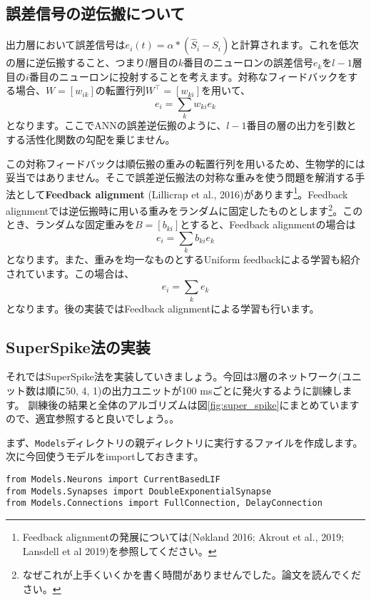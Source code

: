 \subsection{誤差信号の逆伝搬について}
出力層において誤差信号は$e_i(t)=\alpha * \left(\hat{S}_{i}-S_{i}\right)$と計算されます。これを低次の層に逆伝搬すること、つまり$l$層目の$k$番目のニューロンの誤差信号$e_k$を$l-1$層目の$i$番目のニューロンに投射することを考えます。対称なフィードバックをする場合、$W=[w_{ik}]$の転置行列$W^\intercal=[w_{ki}]$を用いて、
\begin{equation}
e_i=\sum_k w_{ki} e_k
\end{equation}
となります。ここでANNの誤差逆伝搬のように、$l-1$番目の層の出力を引数とする活性化関数の勾配を乗じません。\par
この対称フィードバックは順伝搬の重みの転置行列を用いるため、生物学的には妥当ではありません。そこで誤差逆伝搬法の対称な重みを使う問題を解消する手法として\textbf{Feedback alignment} (Lillicrap et al., 2016)があります\footnote{Feedback alignmentの発展については(Nøkland 2016; Akrout et al., 2019; Lansdell et al 2019)を参照してください。}。Feedback alignmentでは逆伝搬時に用いる重みをランダムに固定したものとします\footnote{なぜこれが上手くいくかを書く時間がありませんでした。論文を読んでください。}。このとき、ランダムな固定重みを$B=[b_{ki}]$とすると、Feedback alignmentの場合は
\begin{equation}
e_i=\sum_k b_{ki} e_k
\end{equation}
となります。また、重みを均一なものとするUniform feedbackによる学習も紹介されています。この場合は、
\begin{equation}
e_i=\sum_k e_k
\end{equation}
となります。後の実装ではFeedback alignmentによる学習も行います。

\subsection{SuperSpike法の実装}
それではSuperSpike法を実装していきましょう。今回は3層のネットワーク(ユニット数は順に50, 4, 1)の出力ユニットが100 msごとに発火するように訓練します。 訓練後の結果と全体のアルゴリズムは図\ref{fig:super_spike}にまとめていますので、適宜参照すると良いでしょう。。\par
まず、\texttt{Models}ディレクトリの親ディレクトリに実行するファイルを作成します。次に今回使うモデルをimportしておきます。
\begin{verbatim}
from Models.Neurons import CurrentBasedLIF
from Models.Synapses import DoubleExponentialSynapse
from Models.Connections import FullConnection, DelayConnection
\end{verbatim}
